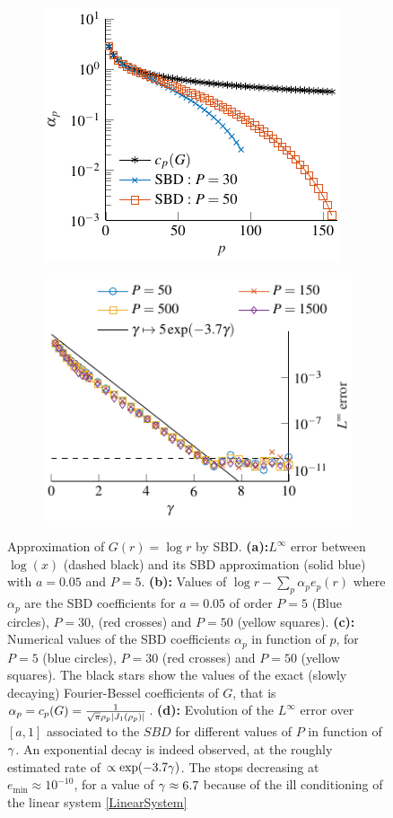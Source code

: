 \documentclass{article}
\begin{document}
\begin{figure}[ht]
	\begin{subfigure}[b]{\plotwidth}
		\centering
		\includegraphics[scale = 0.85]{SBDCoeffLog}
		\caption{}	
	\end{subfigure}%
	\begin{subfigure}[b]{\plotwidth}
		\centering
		\includegraphics[scale = 0.85]{ApplicationNumLaplace}
		\caption{}				
		\label{ApplicationNumLaplace}
	\end{subfigure}%
	\caption{Approximation of $G(r) = \log r$ by SBD. \textbf{(a):}$L^{\infty}$ error between $\log(x)$ (dashed black) and its SBD approximation (solid blue) with $a=0.05$ and $P=5$. \textbf{(b):} Values of $\log r - \sum_{p}\alpha_pe_p(r)$ where $\alpha_p$ are the SBD coefficients for $a=0.05$ of order $P=5$ (Blue circles), $P=30$, (red crosses) and $P=50$ (yellow squares). \textbf{(c):} Numerical values of the SBD coefficients $\alpha_p$ in function of $p$, for $P=5$ (blue circles), $P=30$ (red crosses) and $P=  50$ (yellow squares). The black stars show the values of the exact (slowly decaying) Fourier-Bessel coefficients of $G$, that is $\alpha_p = c_p(G) = \frac{1}{\sqrt{\pi}\rho_p \left\lvert J_1(\rho_p) \right\rvert}$. \textbf{(d):} Evolution of the $L^{\infty}$ error over $[a,1]$ associated to the $SBD$ for different values of $P$ in function of $\gamma$. An exponential decay is indeed observed, at the roughly estimated rate of $\propto \exp(-3.7\gamma)$. The stops decreasing at $e_{\min} \approx 10^{-10}$, for a value of $\gamma \approx 6.7$ because of the ill conditioning of the linear system \eqref{LinearSystem}}
	\label{MultiFig}
\end{figure}
\end{document}
